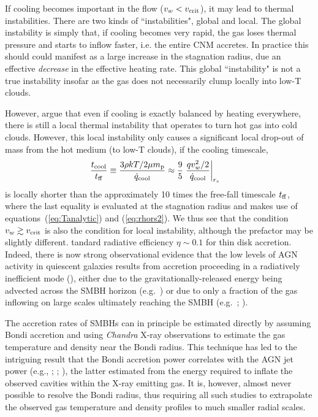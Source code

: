 \documentclass[usenatbib,fleqn]{mn2e}
\newcommand{\rs}{r_s}
\newcommand{\vw}{v_w}
\renewcommand{\mp}{m_{\rm p}}
\newcommand{\tcool}{t_{\rm cool}}
\newcommand{\tff}{t_{\rm ff}}
\begin{document}
If cooling becomes important in the flow ($v_{w} < v_{\rm crit}$), it may lead to thermal instabilities.  There are two kinds of ``instabilities", global and local.  The global instability is simply that, if cooling becomes very rapid, the gas loses thermal pressure and starts to inflow faster, i.e. the entire CNM accretes.  In
practice this should could manifest as a large increase in the stagnation radius, due an effective {\it decrease} in the effective heating rate.  This global ``instability" is not a true instability insofar as the gas does not necessarily clump locally into low-T clouds.

However, \citet{McCourt+12} argue that even if cooling is exactly balanced by heating everywhere, there is still a local thermal instability that operates to turn hot gas into cold clouds.  However, this local instability only causes a significant local drop-out of mass from the hot medium (to low-T clouds), if the cooling timescale,
\begin{align}
\frac{\tcool}{\tff} &\equiv \frac{3\rho k T/2 \mu \mp}{\dot{q}_{\rm cool}} \approx \frac{9}{5} \left. \frac{q \vw^2/2}{\dot{q}_{\rm cool}}\right|_{\rs}
\end{align} 
is locally shorter than the approximately 10 times the free-fall
timescale $t_{\rm ff}$, where the last equality is evaluated at the stagnation radius and makes use of equations~(\ref{eq:Tanalytic}) and (\ref{eq:rhors2}).  We thus see that the condition $v_w \gtrsim v_{\rm crit}$ is also the condition for local instability, although the prefactor may be slightly different.
tandard radiative efficiency $\eta
\sim 0.1$ for thin disk accretion.  Indeed, there is now strong
observational evidence that the low levels of AGN activity in
quiescent galaxies results from accretion proceeding in a radiatively
inefficient mode (\citealt{Yuan&Narayan14}), either due to the
gravitationally-released energy being advected across the SMBH horizon
(e.g.~\citealt{Narayan&Yi95}) or due to only a fraction of the gas
inflowing on large scales ultimately reaching the SMBH
(e.g.~\citealt{Blandford&Begelman99}; \citealt{Li+13}).

The accretion rates of SMBHs can in principle be estimated directly by
assuming Bondi accretion and using {\it Chandra} X-ray observations to
estimate the gas temperature and density near the Bondi radius.  This
technique has led to the intriguing result that the Bondi accretion
power correlates with the AGN jet power (e.g.,
\citealt{AllenDunn+:2006a}; \citealt{Russell+13};
\citealt{FujitaKawakatu+:2014a}), the latter estimated from the energy
required to inflate the observed cavities within the X-ray emitting
gas.  It is, however, almost never possible to resolve the Bondi
radius, thus requiring all such studies to extrapolate the observed
gas temperature and density profiles to much smaller radial scales.
\end{document}
